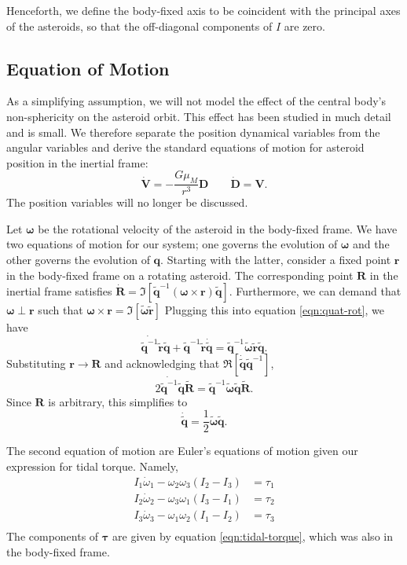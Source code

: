 \documentclass[11pt]{article}
\newcommand{\quat}[1]{\widetilde{\bm{#1}}}
\begin{document}
Henceforth, we define the body-fixed axis to be coincident with the principal axes of the asteroids, so that the off-diagonal components of $I$ are zero.

\subsection{Equation of Motion}
As a simplifying assumption, we will not model the effect of the central body's non-sphericity on the asteroid orbit. This effect has been studied in much detail and is small. We therefore separate the position dynamical variables from the angular variables and derive the standard equations of motion for asteroid position in the inertial frame:
\begin{equation}
\dot{\bm{V}} = -\frac{G\mu_M}{r^3}\bm{D}\qquad \dot{\bm{D}} = \bm{V}.
\label{eqn:translaton-eom}
\end{equation}
The position variables will no longer be discussed.

Let $\bm\omega$ be the rotational velocity of the asteroid in the body-fixed frame. We have two equations of motion for our system; one governs the evolution of $\bm \omega$ and the other governs the evolution of $\bm q$. Starting with the latter, consider a fixed point $\bm r$ in the body-fixed frame on a rotating asteroid. The corresponding point $\bm R$ in the inertial frame satisfies $\dot{\bm R} = \Im[\quat q^{-1}(\bm \omega \times \bm r )\quat q]$. Furthermore, we can demand that $\bm \omega \perp \bm r$ such that $\bm \omega \times \bm r = \Im[\quat \omega \quat r]$ Plugging this into equation \ref{eqn:quat-rot}, we have
\begin{equation*}
\dot{\quat q^{-1}} \quat r \quat q + \quat q^{-1} \quat r \dot{\quat q} = \quat q^{-1}\quat \omega \quat r \quat q.
\end{equation*}
Substituting $\bm r \rightarrow \bm R$ and acknowledging that $\Re[\dot{\quat q} \quat q^{-1}]$,
\begin{equation*}
2\dot{\quat q^{-1}}\quat q\quat R = \quat q^{-1}\quat \omega \quat q \quat R.
\end{equation*}
Since $\bm R$ is arbitrary, this simplifies to
\begin{equation}
\dot{\quat q} = \frac{1}{2}\quat \omega\quat q.
\label{eqn:quat-eom}
\end{equation}

The second equation of motion are Euler's equations of motion given our expression for tidal torque. Namely,
\begin{equation}
\begin{aligned}
I_1 \dot \omega_1 - \omega_2 \omega_3 (I_2 - I_3) &= \tau_1\\
I_2 \dot \omega_2 - \omega_3 \omega_1 (I_3 - I_1) &= \tau_2\\
I_3 \dot \omega_3 - \omega_1 \omega_2 (I_1 - I_2) &= \tau_3\\
\end{aligned}
\label{eqn:omega-eom}
\end{equation}
The components of $\bm \tau$ are given by equation \ref{eqn:tidal-torque}, which was also in the body-fixed frame.
\end{document}
